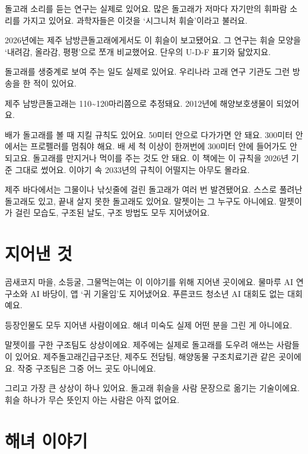 \documentclass[
  korean,
  letterpaper,
  twoside,
  open=any,
  fontsize=12.5pt,
  headings=small]{scrbook}
\begin{document}
돌고래 소리를 듣는 연구는
실제로 있어요. 많은 돌고래가
저마다 자기만의 휘파람 소리를
가지고 있어요. 과학자들은
이것을 `시그니처 휘슬'이라고
불러요.

2026년에는 제주
남방큰돌고래에게서도 이 휘슬이
보고됐어요. 그 연구는 휘슬
모양을 `내려감, 올라감,
평평'으로 쪼개 비교했어요.
단우의 \mbox{U-D-F} 표기와
닮았지요.

돌고래를 생중계로 보여 주는
일도 실제로 있어요. 우리나라
고래 연구 기관도 그런 방송을
한 적이 있어요.

제주 남방큰돌고래는
110\textasciitilde120마리쯤으로
추정돼요. 2012년에
해양보호생물이 되었어요.

배가 돌고래를 볼 때 지킬
규칙도 있어요. 50미터 안으로
다가가면 안 돼요. 300미터
안에서는 프로펠러를 멈춰야
해요. 배 세 척 이상이 한꺼번에
300미터 안에 들어가도 안
되고요. 돌고래를 만지거나
먹이를 주는 것도 안 돼요. 이
책에는 이 규칙을 2026년 기준
그대로 썼어요. 이야기 속
2033년의 규칙이 어떨지는
아무도 몰라요.

제주 바다에서는 그물이나
낚싯줄에 걸린 돌고래가 여러 번
발견됐어요. 스스로 풀려난
돌고래도 있고, 끝내 살지 못한
돌고래도 있어요. 말젯이는 그
누구도 아니에요. 말젯이가 걸린
모습도, 구조된 날도, 구조
방법도 모두 지어냈어요.

\section*{지어낸
것}\label{uxc9c0uxc5b4uxb0b8-uxac83-1}


곰새코지 마을, 소등굴,
그물먹는여는 이 이야기를 위해
지어낸 곳이에요. 물마루 AI
연구소와 AI 바당이, 앱 `귀
기울임'도 지어냈어요. 푸른코드
청소년 AI 대회도 없는
대회예요.

등장인물도 모두 지어낸
사람이에요. 해녀 미숙도 실제
어떤 분을 그린 게 아니에요.

말젯이를 구한 구조팀도
상상이에요. 제주에는 실제로
돌고래를 도우려 애쓰는
사람들이 있어요.
제주돌고래긴급구조단, 제주도
전담팀, 해양동물 구조치료기관
같은 곳이에요. 작중 구조팀은
그중 어느 곳도 아니에요.

그리고 가장 큰 상상이 하나
있어요. 돌고래 휘슬을 사람
문장으로 옮기는 기술이에요.
휘슬 하나가 무슨 뜻인지 아는
사람은 아직 없어요.

\section*{해녀
이야기}\label{uxd574uxb140-uxc774uxc57cuxae30}
\end{document}
